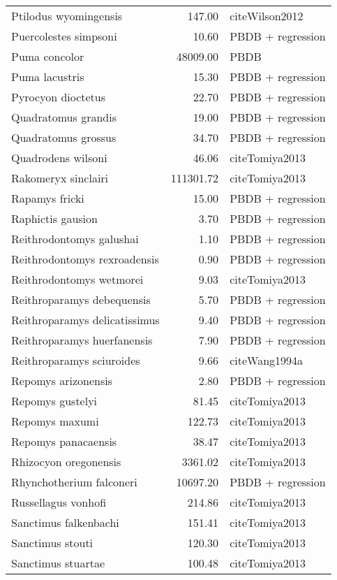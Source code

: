 \begin{table}[ht]
\begin{tabular}{lrl}
  Ptilodus wyomingensis & 147.00 & cite{Wilson2012} \\ 
  Puercolestes simpsoni & 10.60 & PBDB + regression \\ 
  Puma concolor & 48009.00 & PBDB \\ 
  Puma lacustris & 15.30 & PBDB + regression \\ 
  Pyrocyon dioctetus & 22.70 & PBDB + regression \\ 
  Quadratomus grandis & 19.00 & PBDB + regression \\ 
  Quadratomus grossus & 34.70 & PBDB + regression \\ 
  Quadrodens wilsoni & 46.06 & cite{Tomiya2013} \\ 
  Rakomeryx sinclairi & 111301.72 & cite{Tomiya2013} \\ 
  Rapamys fricki & 15.00 & PBDB + regression \\ 
  Raphictis gausion & 3.70 & PBDB + regression \\ 
  Reithrodontomys galushai & 1.10 & PBDB + regression \\ 
  Reithrodontomys rexroadensis & 0.90 & PBDB + regression \\ 
  Reithrodontomys wetmorei & 9.03 & cite{Tomiya2013} \\ 
  Reithroparamys debequensis & 5.70 & PBDB + regression \\ 
  Reithroparamys delicatissimus & 9.40 & PBDB + regression \\ 
  Reithroparamys huerfanensis & 7.90 & PBDB + regression \\ 
  Reithroparamys sciuroides & 9.66 & cite{Wang1994a} \\ 
  Repomys arizonensis & 2.80 & PBDB + regression \\ 
  Repomys gustelyi & 81.45 & cite{Tomiya2013} \\ 
  Repomys maxumi & 122.73 & cite{Tomiya2013} \\ 
  Repomys panacaensis & 38.47 & cite{Tomiya2013} \\ 
  Rhizocyon oregonensis & 3361.02 & cite{Tomiya2013} \\ 
  Rhynchotherium falconeri & 10697.20 & PBDB + regression \\ 
  Russellagus vonhofi & 214.86 & cite{Tomiya2013} \\ 
  Sanctimus falkenbachi & 151.41 & cite{Tomiya2013} \\ 
  Sanctimus stouti & 120.30 & cite{Tomiya2013} \\ 
  Sanctimus stuartae & 100.48 & cite{Tomiya2013} \\ 

\end{tabular}
\end{table}
